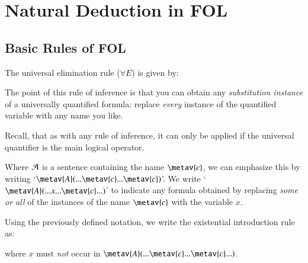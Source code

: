 %
%
%
\chapter{Natural Deduction in FOL}
\label{NatDeductFOL} %

\section{ Basic Rules of FOL}

\begin{definition}
    The universal elimination rule ($\forall E$) is given by:
    \begin{fitchproof}
         
    \end{fitchproof}
\end{definition}

The point of this rule of inference is that you can obtain any \emph{substitution instance} of a universally quantified formula: replace \emph{every} instance of the quantified variable with any name you like.

Recall, that as with any rule of inference, it can only be applied if the universal quantifier is the main logical operator.

\begin{definition}
    Where $\mathcal{A}$ is a sentence containing the name $\metav{c}$, we can emphasize this by writing `$\metav{A}(...\metav{c}...\metav{c})$'. We write `$\metav{A}(...x...\metav{c}...)$' to indicate any formula obtained by replacing \emph{some or all} of the instances of the name $\metav{c}$ with the variable $x$.
\end{definition}

\begin{definition}
    Using the previously defined notation, we write the existential introduction rule as: 
    \begin{fitchproof}
         
    \end{fitchproof}
    where $x$ must \emph{not} occur in $\metav{A}(...\metav{c}...\metav{c}...)$.
\end{definition}

